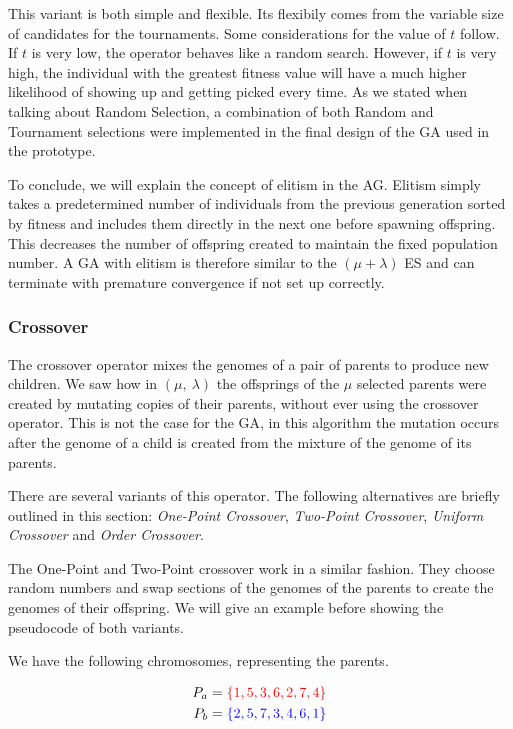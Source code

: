 This variant is both simple and flexible. Its flexibily comes from the variable size of candidates for the tournaments. Some considerations for the value of $t$ follow. If $t$ is very low, the operator behaves like a random search. However, if $t$ is very high, the individual with the greatest fitness value will have a much higher likelihood of showing up and getting picked every time. As we stated when talking about Random Selection, a combination of both Random and Tournament selections were implemented in the final design of the GA used in the prototype.

To conclude, we will explain the concept of elitism in the AG. Elitism simply takes a predetermined number of individuals from the previous generation sorted by fitness and includes them directly in the next one before spawning offspring. This decreases the number of offspring created to maintain the fixed population number. A GA with elitism is therefore similar to the $(\mu + \lambda)$ ES and can terminate with premature convergence if not set up correctly. 


\subsubsection{Crossover}

The crossover operator mixes the genomes of a pair of parents to produce new children. We saw how in $(\mu,\ \lambda)$ the offsprings of the $\mu$ selected parents were created by mutating copies of their parents, without ever using the crossover operator. This is not the case for the GA, in this algorithm the mutation occurs after the genome of a child is created from the mixture of the genome of its parents.

There are several variants of this operator. The following alternatives are briefly outlined in this section: \textit{One-Point Crossover}, \textit{Two-Point Crossover}, \textit{Uniform Crossover} and \textit{Order Crossover}.

The One-Point and Two-Point crossover work in a similar fashion. They choose random numbers and swap sections of the genomes of the parents to create the genomes of their offspring. We will give an example before showing the pseudocode of both variants.

We have the following chromosomes, representing the parents.

\begin{align}
    P_{a} &= \color{red} \{ 1, 5, 3, 6, 2, 7, 4 \}\\
    P_{b} &= \color{blue} \{ 2, 5, 7, 3, 4, 6, 1 \}
\end{align}

